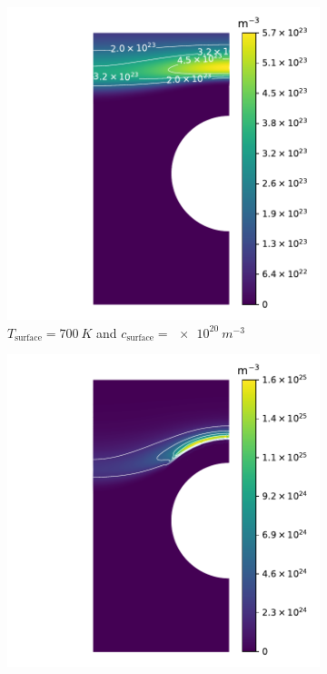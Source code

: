 \begin{figure}
    \centering
    \begin{subfigure}{0.5\linewidth}
        \centering
        \includegraphics[height=\linewidth]{Figures/Chapter3/monoblocks/parametric_study/retention_T=7.000e+02;c=1.00e+20.pdf}
        \caption{$T_\mathrm{surface} = \SI{700}{K}$ and $c_\mathrm{surface} = \SI{e20}{m^{-3}}$}
    \end{subfigure}%
    \begin{subfigure}{0.5\linewidth}
        \centering
        \includegraphics[height=\linewidth]{Figures/Chapter3/monoblocks/parametric_study/retention_T=1.000e+03;c=1.00e+21.pdf}

\end{subfigure}
\end{figure}
